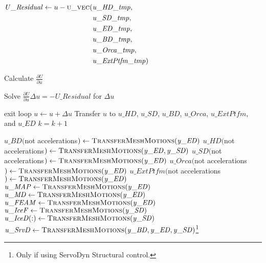 \documentclass[10pt,letterpaper,oneside,notitlepage]{article}
\begin{document}
\begin{algorithmic}[1]
      \State
      \State$\mathit{U\_Residual} \gets u - \Call{u\_vec}{}( \!
                 \begin{aligned}[t]   & \mathit{u\_HD\_tmp}, \\
                                      & \mathit{u\_SD\_tmp}, \\
                                      & \mathit{u\_ED\_tmp}, \\
                                      & \mathit{u\_BD\_tmp}, \\
                                      & \mathit{u\_Orca\_tmp},\\
                                      & \mathit{u\_ExtPtfm\_tmp})
                     \end{aligned}$
      \State
      
         \State Calculate $\frac{\partial U}{\partial u}$
      \EndIf
      

      \State Solve  $\frac{\partial U}{\partial u} \Delta u = - \mathit{U\_Residual}$ for $\Delta u$

      \State    
       
         \State exit loop
      \EndIf
      \State
      \State $u \gets u + \Delta u$
      \State Transfer $u$ to $\mathit{u\_HD}$, $\mathit{u\_SD}$, $\mathit{u\_BD}$, $\mathit{u\_Orca}$, $\mathit{u\_ExtPtfm}$, and $\mathit{u\_ED}$
      \State $k=k+1$
      
   \EndLoop   
   
   \State{}
   \State 
   
   \State$\mathit{u\_BD}($not accelerations$) \gets \Call{TransferMeshMotions}{\mathit{y\_ED}}$
   \State$\mathit{u\_HD}($not accelerations$) \gets \Call{TransferMeshMotions}{\mathit{y\_ED},\mathit{y\_SD}}$
   \State$\mathit{u\_SD}($not accelerations$) \gets \Call{TransferMeshMotions}{\mathit{y\_ED}}$
   \State$\mathit{u\_Orca}($not accelerations$) \gets \Call{TransferMeshMotions}{\mathit{y\_ED}}$   \State$\mathit{u\_ExtPtfm}($not accelerations$) \gets \Call{TransferMeshMotions}{\mathit{y\_ED}}$
  \State 
   \State $\mathit{u\_MAP}     \gets \Call{TransferMeshMotions}{\mathit{y\_ED}}$
   \State $\mathit{u\_MD}      \gets \Call{TransferMeshMotions}{\mathit{y\_ED}}$
   \State $\mathit{u\_FEAM}    \gets \Call{TransferMeshMotions}{\mathit{y\_ED}}$
   \State $\mathit{u\_IceF}    \gets \Call{TransferMeshMotions}{\mathit{y\_SD}}$
   \State $\mathit{u\_IceD(:)} \gets \Call{TransferMeshMotions}{\mathit{y\_SD}}$
   \State $\mathit{u\_SrvD}    \gets \Call{TransferMeshMotions}{\mathit{y\_BD,y\_ED,y\_SD}}$\footnote{Only if using ServoDyn Structural control.}    %
         
\EndProcedure
\end{algorithmic}
\end{document}
